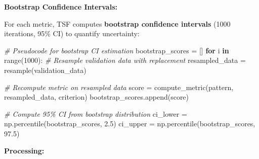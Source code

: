\documentclass[
]{article}
\newenvironment{Shaded}{}{}
\newcommand{\BuiltInTok}[1]{\textcolor[rgb]{0.00,0.50,0.00}{#1}}
\newcommand{\CommentTok}[1]{\textcolor[rgb]{0.38,0.63,0.69}{\textit{#1}}}
\newcommand{\ControlFlowTok}[1]{\textcolor[rgb]{0.00,0.44,0.13}{\textbf{#1}}}
\newcommand{\DecValTok}[1]{\textcolor[rgb]{0.25,0.63,0.44}{#1}}
\newcommand{\FloatTok}[1]{\textcolor[rgb]{0.25,0.63,0.44}{#1}}
\newcommand{\KeywordTok}[1]{\textcolor[rgb]{0.00,0.44,0.13}{\textbf{#1}}}
\newcommand{\NormalTok}[1]{#1}
\newcommand{\OperatorTok}[1]{\textcolor[rgb]{0.40,0.40,0.40}{#1}}
\begin{document}
\textbf{Bootstrap Confidence Intervals:}

For each metric, TSF computes \textbf{bootstrap confidence intervals}
(1000 iterations, 95\% CI) to quantify uncertainty:

\begin{Shaded}
\begin{Highlighting}[]
\CommentTok{\# Pseudocode for bootstrap CI estimation}
\NormalTok{bootstrap\_scores }\OperatorTok{=}\NormalTok{ []}
\ControlFlowTok{for}\NormalTok{ i }\KeywordTok{in} \BuiltInTok{range}\NormalTok{(}\DecValTok{1000}\NormalTok{):}
    \CommentTok{\# Resample validation data with replacement}
\NormalTok{    resampled\_data }\OperatorTok{=}\NormalTok{ resample(validation\_data)}

    \CommentTok{\# Recompute metric on resampled data}
\NormalTok{    score }\OperatorTok{=}\NormalTok{ compute\_metric(pattern, resampled\_data, criterion)}
\NormalTok{    bootstrap\_scores.append(score)}

\CommentTok{\# Compute 95\% CI from bootstrap distribution}
\NormalTok{ci\_lower }\OperatorTok{=}\NormalTok{ np.percentile(bootstrap\_scores, }\FloatTok{2.5}\NormalTok{)}
\NormalTok{ci\_upper }\OperatorTok{=}\NormalTok{ np.percentile(bootstrap\_scores, }\FloatTok{97.5}\NormalTok{)}
\end{Highlighting}
\end{Shaded}

\textbf{Processing:}
\end{document}
